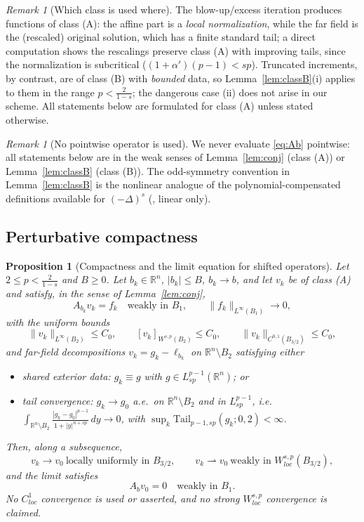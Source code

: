 \documentclass[11pt]{amsart}
\theoremstyle{plain}
\newtheorem{proposition}[theorem]{Proposition}
\theoremstyle{definition}
\theoremstyle{remark}
\newtheorem{remark}[theorem]{Remark}
\newcommand{\R}{\mathbb{R}}
\newcommand{\al}{\alpha}
\newcommand{\Tail}{\mathrm{Tail}_{p-1,sp}}
\begin{document}
\begin{remark}[Which class is used where]\label{rem:whichclass}
The blow-up/excess iteration produces functions of class \textnormal{(A)}:
the affine part is a \emph{local normalization}, while the far field is the
(rescaled) original solution, which has a finite standard tail; a direct
computation shows the rescalings preserve class \textnormal{(A)} with
improving tails, since the normalization is subcritical
($(1+\al')(p-1)<sp$). Truncated increments, by contrast, are of class
\textnormal{(B)} with \emph{bounded} data, so Lemma~\ref{lem:classB}(i)
applies to them in the range $p<\frac2{1-s}$; the dangerous case (ii) does
not arise in our scheme. All statements below are formulated for class
\textnormal{(A)} unless stated otherwise.
\end{remark}

\begin{remark}[No pointwise operator is used]\label{rem:no-pointwise}
We never evaluate \eqref{eq:Ab} pointwise: all statements below are in the
weak senses of Lemma~\ref{lem:conj} (class (A)) or Lemma~\ref{lem:classB}
(class (B)). The odd-symmetry convention in Lemma~\ref{lem:classB} is the
nonlinear analogue of the polynomial-compensated definitions available for
$(-\Delta)^s$ \textnormal{(}\cite{DSV}, linear only\textnormal{)}.
\end{remark}

\subsection{Perturbative compactness}

\begin{proposition}[Compactness and the limit equation for shifted
operators]\label{prop:P1}
Let $2\le p<\frac2{1-s}$ and $B\ge0$. Let $b_k\in\R^n$, $|b_k|\le B$,
$b_k\to b$, and let $v_k$ be of class \textnormal{(A)} and satisfy, in the
sense of Lemma~\ref{lem:conj},
\[
  A_{b_k}v_k=f_k\quad\text{weakly in }B_1,
  \qquad \|f_k\|_{L^\infty(B_1)}\to0,
\]
with the uniform bounds
\[
  \|v_k\|_{L^\infty(B_2)}\le C_0,\qquad
  [v_k]_{W^{s,p}(B_2)}\le C_0,\qquad
  \|v_k\|_{C^{0,1}(B_{3/2})}\le C_0,
\]
and far-field decompositions $v_k=g_k-\ell_{b_k}$ on $\R^n\setminus B_2$
satisfying \emph{either}
\begin{itemize}[leftmargin=2em]
\item[\textnormal{(E1)}] shared exterior data: $g_k\equiv g$ with
  $g\in L^{p-1}_{sp}(\R^n)$; \emph{or}
\item[\textnormal{(E2)}] tail convergence: $g_k\to g_0$ a.e.\ on
  $\R^n\setminus B_2$ and in $L^{p-1}_{sp}$, i.e.
  $\int_{\R^n\setminus B_2}\frac{|g_k-g_0|^{p-1}}{1+|y|^{n+sp}}\,dy\to0$,
  with $\sup_k\Tail(g_k;0,2)<\infty$.
\end{itemize}
Then, along a subsequence,
\[
  v_k\to v_0\ \text{locally uniformly in }B_{3/2},
  \qquad
  v_k\rightharpoonup v_0\ \text{weakly in }W^{s,p}_{loc}(B_{3/2}),
\]
and the limit satisfies
\[
  A_bv_0=0\quad\text{weakly in }B_1 .
\]
No $C^1_{loc}$ convergence is used or asserted, and no strong
$W^{s,p}_{loc}$ convergence is claimed.
\end{proposition}
\end{document}
